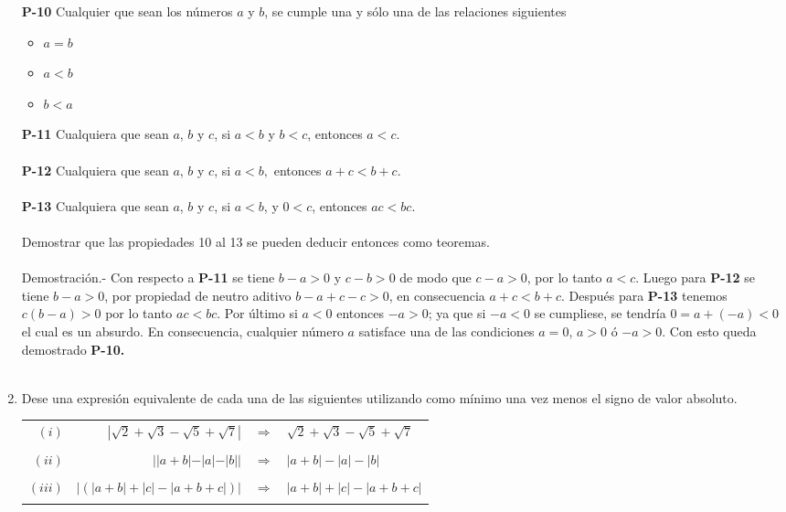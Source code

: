 \begin{enumerate}[\bfseries 1.]
\textbf{P-10} Cualquier que sean los números $a$ y $b$, se cumple una y sólo una de las relaciones siguientes
\begin{itemize}
\item $a=b$
\item $a<b$
\item $b<a$\\
\end{itemize}
\textbf{P-11} Cualquiera que sean $a$, $b$ y $c$, si $a<b$ y $b<c$, entonces $a<c$.\\\\
\textbf{P-12} Cualquiera que sean $a$, $b$ y $c$, si $a<b,$ entonces $a+c<b+c.$\\\\
\textbf{P-13} Cualquiera que sean $a$, $b$ y $c$, si $a<b$, y $0<c$, entonces $ac<bc.$\\\\
Demostrar que las propiedades 10 al 13 se pueden deducir entonces como teoremas.\\\\
Demostración.- \; Con respecto a \textbf{P-11} se tiene  $b-a>0$ y $c-b>0$ de modo que $c-a>0$, por lo tanto $a<c$. Luego para \textbf{P-12} se tiene $b-a>0$, por propiedad de neutro aditivo $b-a+c-c>0$, en consecuencia $a+c<b+c$. Después para \textbf{P-13} tenemos $c(b-a)>0$ por lo tanto $ac<bc$. Por último si $a<0$ entonces $-a>0$; ya que si $-a<0$ se cumpliese, se tendría $0=a+(-a)<0$ el cual es un absurdo. En consecuencia, cualquier número $a$ satisface una de las condiciones $a=0$, $a>0$ ó $-a>0.$ Con esto queda demostrado \textbf{P-10.}\\\\

\item Dese una expresión equivalente de cada una de las siguientes utilizando como mínimo una vez menos el signo de valor absoluto.\\
\begin{center}
\begin{tabular}{r r c l}
$(i)$&$|\sqrt{2}+\sqrt{3}-\sqrt{5}+\sqrt{7}|$&$\Rightarrow$&$\sqrt{2}+\sqrt{3}-\sqrt{5}+\sqrt{7}$\\\\

$(ii)$&$||a+b|-|a|-|b||$&$\Rightarrow$&$|a+b|-|a|-|b|$\\\\

$(iii)$&$|\left( |a+b|+|c|-|a+b+c| \right)|$&$\Rightarrow$&$|a+b|+|c|-|a+b+c|$\\\\


\end{tabular}
\end{center}
\end{enumerate}

